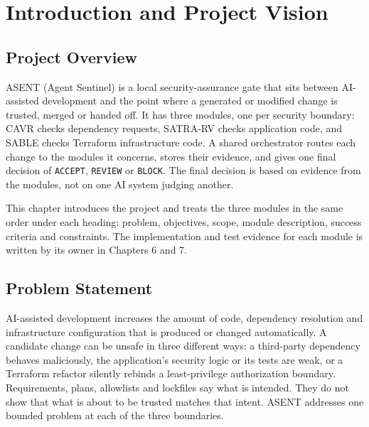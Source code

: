 \chapter{Introduction and Project Vision}
\section{Project Overview}
\begin{sloppypar}
ASENT (Agent Sentinel) is a local security-assurance gate that sits between AI-assisted development and the point where a generated or modified change is trusted, merged or handed off. It has three modules, one per security boundary: CAVR checks dependency requests, SATRA-RV checks application code, and SABLE checks Terraform infrastructure code. A shared orchestrator routes each change to the modules it concerns, stores their evidence, and gives one final decision of \texttt{ACCEPT}, \texttt{REVIEW} or \texttt{BLOCK}. The final decision is based on evidence from the modules, not on one AI system judging another.
\end{sloppypar}

This chapter introduces the project and treats the three modules in the same order under each heading: problem, objectives, scope, module description, success criteria and constraints. The implementation and test evidence for each module is written by its owner in Chapters 6 and 7.

\section{Problem Statement}
\begin{sloppypar}
AI-assisted development increases the amount of code, dependency resolution and infrastructure configuration that is produced or changed automatically. A candidate change can be unsafe in three different ways: a third-party dependency behaves maliciously, the application's security logic or its tests are weak, or a Terraform refactor silently rebinds a least-privilege authorization boundary. Requirements, plans, allowlists and lockfiles say what is intended. They do not show that what is about to be trusted matches that intent. ASENT addresses one bounded problem at each of the three boundaries.
\end{sloppypar}

